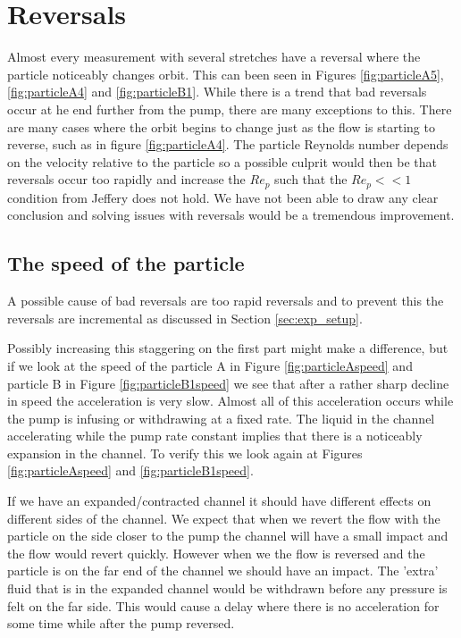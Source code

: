 \section{Reversals}
Almost every measurement with several stretches have a reversal where the particle noticeably changes orbit. This can been seen in Figures \ref{fig:particleA5}, \ref{fig:particleA4} and \ref{fig:particleB1}. While there is a trend that bad reversals occur at he end further from the pump, there are many exceptions to this. There are many cases where the orbit begins to change just as the flow is starting to reverse, such as in figure \ref{fig:particleA4}. The particle Reynolds number depends on the velocity relative to the particle so a possible culprit would then be that reversals occur too rapidly and increase the $Re_p$ such that the $Re_p << 1$ condition from Jeffery \cite{Jeffery} does not hold. We have not been able to draw any clear conclusion and solving issues with reversals would be a tremendous improvement.


\subsection{The speed of the particle}
A possible cause of bad reversals are too rapid reversals and to prevent this the reversals are incremental as discussed in Section \ref{sec:exp_setup}. 

Possibly increasing this staggering on the first part might make a difference, but if we look at the speed of the particle A in Figure \ref{fig:particleAspeed} and particle B in Figure \ref{fig:particleB1speed} we see that after a rather 
sharp decline in speed the acceleration is very slow. Almost all of this acceleration occurs while the pump is 
infusing or withdrawing at a fixed rate. The liquid in the channel accelerating while the pump rate constant implies that there 
is a noticeably expansion in the channel. To verify this we look again at Figures
\ref{fig:particleAspeed} and \ref{fig:particleB1speed}.

If we have an expanded/contracted channel it should have different effects on different sides of the channel. We 
expect that when we revert the flow with the particle on the side closer to the pump the channel will have a small impact
and the flow would revert quickly.
However when we the flow is reversed and the particle is on the far end of the channel we should have an impact. 
The 'extra' fluid that is in the expanded channel would be withdrawn before any pressure is felt on the far 
side. This would cause a delay where there is no acceleration for some time while after the pump reversed. 

